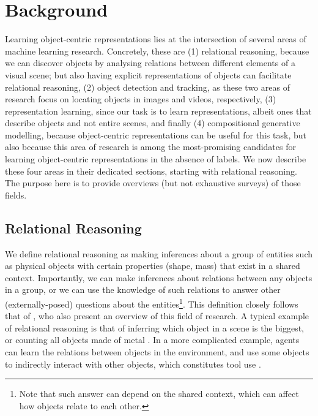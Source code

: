 \chapter{Background}
\label{ch:lit_review}

	Learning object-centric representations lies at the intersection of several areas of machine learning research. 
	Concretely, these are
	(1) relational reasoning, because we can discover objects by analysing relations between different elements of a visual scene; but also having explicit representations of objects can facilitate relational reasoning,
	(2) object detection and tracking, as these two areas of research focus on locating objects in images and videos, respectively,
	(3) representation learning, since our task is to learn representations, albeit ones that describe objects and not entire scenes, and finally
	(4) compositional generative modelling, because object-centric representations can be useful for this task, but also because this area of research is among the most-promising candidates for learning object-centric representations in the absence of labels.
	We now describe these four areas in their dedicated sections, starting with relational reasoning.
	The purpose here is to provide overviews (but not exhaustive surveys) of those fields.


\section{Relational Reasoning}
\label{sec:relational_reasoning}

	We define relational reasoning as making inferences about a group of entities such as physical objects with certain properties (\!\eg shape, mass) that exist in a shared context.
	Importantly, we can make inferences about relations between any objects in a group, or we can use the knowledge of such relations to answer other (externally-posed) questions about the entities\footnote{Note that such answer can depend on the shared context, which can affect how objects relate to each other.}.
	This definition closely follows that of \cite{Battaglia2018relnets}, who also present an overview of this field of research. 
	A typical example of relational reasoning is that of inferring which object in a scene is the biggest, or counting all objects made of metal \citep{Santoro2017}.
	In a more complicated example, agents can learn the relations between objects in the environment, and use some objects to indirectly interact with other objects, which constitutes tool use \citep{Baker2019tooluse}.
	
